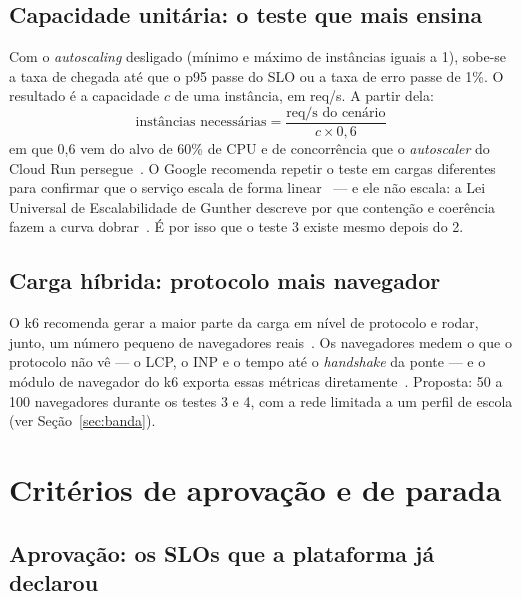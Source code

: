 \documentclass[11pt, a4paper, oneside, openany]{report}
\begin{document}
\section{Capacidade unitária: o teste que mais ensina}
\label{sec:unitaria}

Com o \emph{autoscaling} desligado (mínimo e máximo de instâncias iguais a 1),
sobe-se a taxa de chegada até que o p95 passe do SLO ou a taxa de erro passe de
1\%. O resultado é a capacidade $c$ de uma instância, em req/s. A partir dela:
\begin{equation}
  \text{instâncias necessárias} = \frac{\text{req/s do cenário}}{c \times 0{,}6}
\end{equation}
em que 0,6 vem do alvo de 60\% de CPU e de concorrência que o
\emph{autoscaler} do Cloud Run persegue~\cite{gcrautoscaling}. O Google
recomenda repetir o teste em cargas diferentes para confirmar que o serviço
escala de forma linear~\cite{gcrloadtest} --- e ele não escala: a Lei Universal
de Escalabilidade de Gunther descreve por que contenção e coerência fazem a
curva dobrar~\cite{gunther2007}. É por isso que o teste 3 existe mesmo depois
do 2.

\section{Carga híbrida: protocolo mais navegador}

O k6 recomenda gerar a maior parte da carga em nível de protocolo e rodar,
junto, um número pequeno de navegadores reais~\cite{k6websites}. Os navegadores
medem o que o protocolo não vê --- o LCP, o INP e o tempo até o
\emph{handshake} da ponte --- e o módulo de navegador do k6 exporta essas
métricas diretamente~\cite{k6browsermetrics}. Proposta: 50 a 100 navegadores
durante os testes 3 e 4, com a rede limitada a um perfil de escola (ver
Seção~\ref{sec:banda}).

\chapter{Critérios de aprovação e de parada}
\label{cap:criterios}

\section{Aprovação: os SLOs que a plataforma já declarou}
\end{document}
